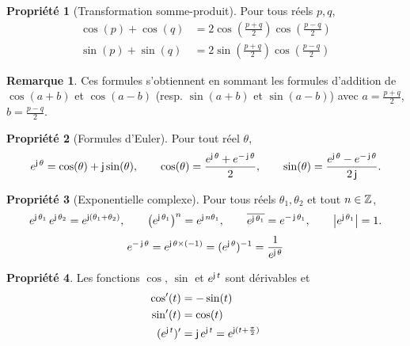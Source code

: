 \documentclass[a4paper,11pt]{article}
\theoremstyle{definition}
\newtheorem{proposition}{Propriété}[section]
\newtheorem{remark}{Remarque}[section]
\begin{document}
\begin{proposition}[Transformation somme-produit]
    Pour tous réels $p,q$,
    $$
    \begin{aligned}
        \cos(p) + \cos(q) &= 2\cos\!\left(\frac{p+q}{2}\right)\cos\!\left(\frac{p-q}{2}\right) \\
        \sin(p) + \sin(q) &= 2\sin\!\left(\frac{p+q}{2}\right)\cos\!\left(\frac{p-q}{2}\right)
    \end{aligned}
    $$
\end{proposition}

\begin{remark}
    Ces formules s'obtiennent en sommant les formules d'addition de $\cos(a+b)$ et $\cos(a-b)$ (resp. $\sin(a+b)$ et $\sin(a-b)$) avec $a=\frac{p+q}{2}$, $b=\frac{p-q}{2}$.
\end{remark}

\begin{proposition}[Formules d'Euler]
    Pour tout réel $\theta$,
    $$
        e^{\operatorname{\mathsf{j}}\theta} = \cos(\theta) + \operatorname{\mathsf{j}}\sin(\theta),
        \qquad
        \cos(\theta) = \frac{e^{\operatorname{\mathsf{j}}\theta} + e^{-\operatorname{\mathsf{j}}\theta}}{2},
        \qquad
        \sin(\theta) = \frac{e^{\operatorname{\mathsf{j}}\theta} - e^{-\operatorname{\mathsf{j}}\theta}}{2\operatorname{\mathsf{j}}}.
    $$
\end{proposition}

\begin{proposition}[Exponentielle complexe]
    Pour tous réels $\theta_1,\theta_2$ et tout $n\in{\mathbb{Z}}$,
    $$
        e^{\operatorname{\mathsf{j}}\theta_1}\,e^{\operatorname{\mathsf{j}}\theta_2} = e^{\operatorname{\mathsf{j}}(\theta_1+\theta_2)},
        \qquad
        \left(e^{\operatorname{\mathsf{j}}\theta_1}\right)^n = e^{\operatorname{\mathsf{j}} n\theta_1},
        \qquad
        \overline{e^{\operatorname{\mathsf{j}}\theta_1}} = e^{-\operatorname{\mathsf{j}}\theta_1},
        \qquad
        \left|e^{\operatorname{\mathsf{j}}\theta_1}\right| = 1.
    $$
    $$
        e^{-\operatorname{\mathsf{j}}\theta} = e^{\operatorname{\mathsf{j}} \theta \times (-1)} = (e^{
            \operatorname{\mathsf{j}}\theta})^{-1} = \frac{1}{e^{\operatorname{\mathsf{j}}\theta}}
    $$
\end{proposition}

\begin{proposition}
    Les fonctions $\cos$, $\sin$ et $e^{\operatorname{\mathsf{j}} t}$ sont dérivables et
    $$
        \begin{aligned}
            \cos^\prime(t) &= -\sin(t) \\
            \sin^\prime(t) &= \cos(t) \\
            (e^{\operatorname{\mathsf{j}} t})^\prime &= \operatorname{\mathsf{j}} e^{\operatorname{\mathsf{j}} t} =e^{\operatorname{\mathsf{j}} (t+\frac{\pi}{2})} 
        \end{aligned}
    $$
\end{proposition}
\end{document}
